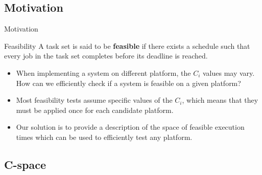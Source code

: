 \documentclass{beamer}
\begin{document}
    \subsection{Motivation}

    \begin{frame}{Motivation}

        \begin{block}{Feasibility}
        A task set is said to be \textbf{feasible} if there exists a schedule such that every job in the task set completes before its deadline is reached.
        \end{block}


        \begin{itemize}
            \item When implementing a system on different platform, the $C_i$ values may vary. How can we efficiently check if a system is feasible on a given platform?

            \item Most feasibility tests assume specific values of the $C_i$, which means that they must be applied once for each candidate platform.

            \item Our solution is to provide a description of the space of feasible execution times which can be  used to efficiently test any platform.
        \end{itemize}
    \end{frame}

    \subsection{C-space}
\end{document}
